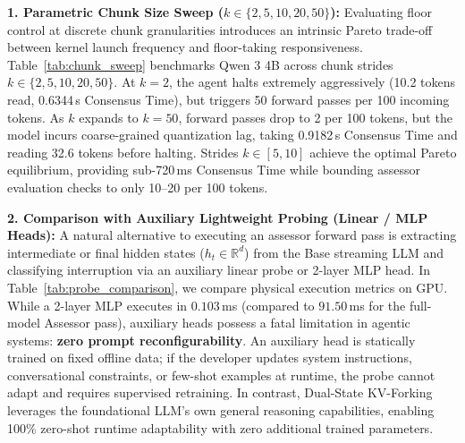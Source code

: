 \documentclass{article}
\begin{document}
\textbf{1. Parametric Chunk Size Sweep ($k \in \{2, 5, 10, 20, 50\}$):}
Evaluating floor control at discrete chunk granularities introduces an intrinsic Pareto trade-off between kernel launch frequency and floor-taking responsiveness. Table~\ref{tab:chunk_sweep} benchmarks Qwen 3 4B across chunk strides $k \in \{2, 5, 10, 20, 50\}$.
At $k=2$, the agent halts extremely aggressively (10.2 tokens read, 0.6344\,s Consensus Time), but triggers 50 forward passes per 100 incoming tokens. As $k$ expands to $k=50$, forward passes drop to 2 per 100 tokens, but the model incurs coarse-grained quantization lag, taking 0.9182\,s Consensus Time and reading 32.6 tokens before halting. Strides $k \in [5, 10]$ achieve the optimal Pareto equilibrium, providing sub-720\,ms Consensus Time while bounding assessor evaluation checks to only 10--20 per 100 tokens.

\begin{table}[h]
\centering
\caption{\textbf{Parametric Chunk Size ($k$) Ablation (Qwen 3 4B, 50 Scenarios).}}
\label{tab:chunk_sweep}
\vspace{0.2cm}
\end{table}

\textbf{2. Comparison with Auxiliary Lightweight Probing (Linear / MLP Heads):}
A natural alternative to executing an assessor forward pass is extracting intermediate or final hidden states ($h_t \in \mathbb{R}^d$) from the Base streaming LLM and classifying interruption via an auxiliary linear probe or 2-layer MLP head. In Table~\ref{tab:probe_comparison}, we compare physical execution metrics on GPU.
While a 2-layer MLP executes in $0.103$\,ms (compared to $91.50$\,ms for the full-model Assessor pass), auxiliary heads possess a fatal limitation in agentic systems: \textbf{zero prompt reconfigurability}. An auxiliary head is statically trained on fixed offline data; if the developer updates system instructions, conversational constraints, or few-shot examples at runtime, the probe cannot adapt and requires supervised retraining. In contrast, Dual-State KV-Forking leverages the foundational LLM's own general reasoning capabilities, enabling 100\% zero-shot runtime adaptability with zero additional trained parameters.
\end{document}
